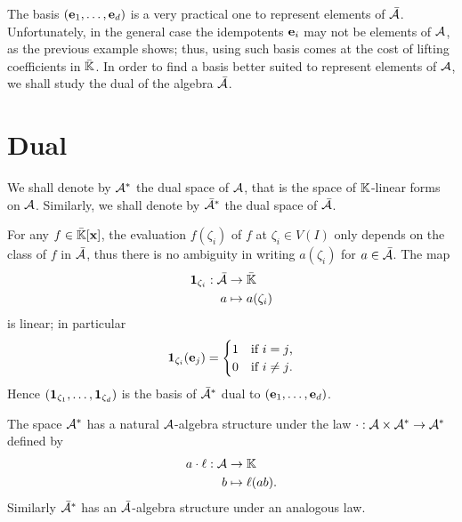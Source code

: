 The basis $(\mathbf{e}_1,\ldots,\mathbf{e}_d)$ is a very practical one
to represent elements of $\bar{\mathcal{A}}$. Unfortunately, in the
general case the idempotents $\mathbf{e}_i$ may not be elements of
$\mathcal{A}$, as the previous example shows; thus, using such basis
comes at the cost of lifting coefficients in $\bar{\mathbb{K}}$. In order to
find a basis better suited to represent elements of $\mathcal{A}$, we
shall study the dual of the algebra $\bar{\mathcal{A}}$.


\section{Dual}
\label{sec:dual}
We shall denote by $\mathcal{A}^\ast$ the dual space of $\mathcal{A}$,
that is the space of $\mathbb{K}$-linear forms on $\mathcal{A}$. Similarly, we
shall denote by $\bar{\mathcal{A}}^\ast$ the dual space of
$\bar{\mathcal{A}}$.

For any $f\in\bar{\mathbb{K}}[\mathbf{x}]$, the evaluation $f(\zeta_i)$ of $f$
at $\zeta_i\in V(I)$ only depends on the class of $f$ in
$\mathcal{\bar{A}}$, thus there is no ambiguity in writing $a(\zeta_i)$
for $a\in\bar{\mathcal{A}}$. The map
\begin{equation}
  \label{eq:8}
  \begin{aligned}
  \mathbf{1}_{\zeta_i} : \bar{\mathcal{A}} &\rightarrow \bar{\mathbb{K}}\\
  a &\mapsto a(\zeta_i)
  \end{aligned}
\end{equation}
is linear; in particular
\begin{equation}
  \label{eq:9}
  \mathbf{1}_{\zeta_i}(\mathbf{e}_j) =
  \begin{cases}
    1 &\text{if $i=j$,}\\
    0 &\text{if $i\ne j$.}
  \end{cases}
\end{equation}
Hence $(\mathbf{1}_{\zeta_1},\ldots,\mathbf{1}_{\zeta_d})$ is the basis
of $\bar{\mathcal{A}}^\ast$ dual to $(\mathbf{e}_1,\ldots,\mathbf{e}_d)$.

The space $\mathcal{A}^\ast$ has a natural $\mathcal{A}$-algebra
structure under the law
$\cdot:\mathcal{A}\times\mathcal{A}^\ast\rightarrow\mathcal{A}^\ast$ defined by
\begin{equation}
  \label{eq:10}
  \begin{aligned}
    a\cdot\ell : \mathcal{A} &\rightarrow \mathbb{K}\\
    b &\mapsto \ell(ab)
    \text{.}
  \end{aligned}
\end{equation}
Similarly $\bar{\mathcal{A}}^\ast$ has an $\bar{\mathcal{A}}$-algebra
structure under an analogous law.

